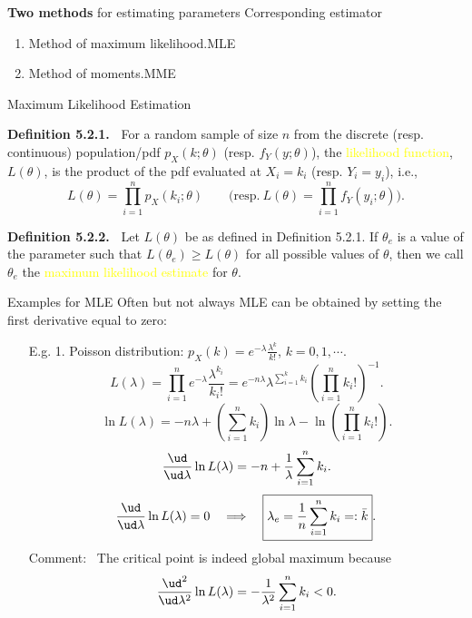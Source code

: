\begin{frame}

{\bf\noindent Two methods} for estimating parameters \hfill Corresponding estimator
\vspace{2em}
\begin{enumerate}
 \item Method of maximum likelihood.\hfill MLE \hspace{3em}\phantom{a}
 \vspace{2em}
 \item Method of moments.\hfill MME \hspace{3em}\phantom{a}
\end{enumerate}

\end{frame}
\begin{frame}{Maximum Likelihood Estimation}

{\bf\noindent Definition 5.2.1.~} For a random sample of size $n$ from the
discrete (resp. continuous) population/pdf $p_X(k;\theta)$ (resp.
$f_Y(y;\theta)$), the \textcolor{yellow}{likelihood function}, $L(\theta)$, is the product of
the pdf evaluated at $X_i=k_i$ (resp. $Y_i=y_i$), i.e., \[ L(\theta) =
\prod_{i=1}^n p_X(k_i;\theta) \qquad \bigg(\text{resp.}\: L(\theta) =
\prod_{i=1}^n f_Y(y_i;\theta) \bigg).  \]

\pause \vfill {\bf\noindent Definition 5.2.2.~} Let $L(\theta)$ be as defined
in Definition 5.2.1. If $\theta_e$ is a value of the parameter such that
$L(\theta_e)\ge L(\theta)$ for all possible values of $\theta$, then we call
$\theta_e$ the \textcolor{yellow}{maximum likelihood estimate} for $\theta$.
\end{frame}
\begin{frame}{Examples for MLE}
Often but not always MLE can be obtained by setting the first derivative equal to zero:\\
\vfill
\begin{enumerate}
 \item[E.g. 1.] Poisson distribution: $p_X(k) = e^{-\lambda}\frac{\lambda^k}{k!}$, $k=0,1,\cdots$.
 \[
 L(\lambda) = \prod_{i=1}^n
e^{-\lambda}\frac{\lambda^{k_i}}{k_i!} = e^{-n\lambda} \lambda^{\sum_{i=1}^k k_i}\left(\prod_{i=1}^n
 k_i!\right)^{-1}.
 \]\pause
 \[
 \ln L(\lambda) = -n\lambda + \left(\sum_{i=1}^{n} k_i\right)\ln \lambda - \ln\left(\prod_{i=1}^{n}k_i!\right).
 \]\pause
 \[
 \frac{\ud }{\ud \lambda} \ln L(\lambda) =  - n + \frac{1}{\lambda}\sum_{i=1}^n k_i.
 \]\pause
 \[
 \frac{\ud }{\ud \lambda} \ln L(\lambda) =0 \quad\Longrightarrow\quad
 \boxed{\lambda_e = \frac{1}{n}\sum_{i=1}^n k_i =: \bar{k}}.
 \]\pause
 \vfill
 {Comment:~} The critical point is indeed global maximum because
 \[
 \frac{\ud^2 }{\ud \lambda^2} \ln L(\lambda) =  - \frac{1}{\lambda^2}\sum_{i=1}^n k_i<0.
 \]
 \end{enumerate}
\end{frame}

